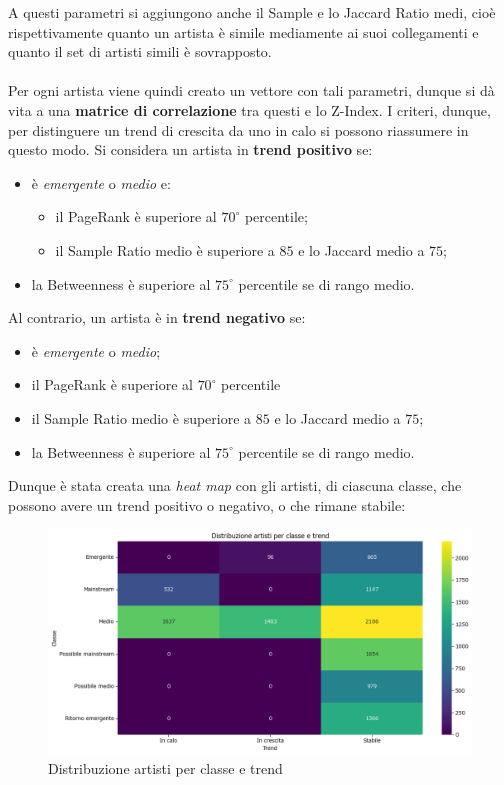 \documentclass[sigchi]{acmart}
\begin{document}
A questi parametri si aggiungono anche il Sample e lo Jaccard Ratio medi, cioè rispettivamente quanto un artista è simile mediamente ai suoi collegamenti e quanto il set di artisti simili è sovrapposto. \\ \\ Per ogni artista viene quindi creato un vettore con tali parametri, dunque si dà vita a una {\bfseries matrice di correlazione} tra questi e lo Z-Index. I criteri, dunque, per distinguere un trend di crescita da uno in calo si possono riassumere in questo modo.
Si considera un artista in {\bfseries trend positivo} se:

\begin{itemize}
	\item è {\itshape emergente} o {\itshape medio} e:
	\begin{itemize}
		\item il PageRank è superiore al $70^\circ$ percentile;
		\item il Sample Ratio medio è superiore a $85$ e lo Jaccard medio a $75$;
	\end{itemize}
	\item la Betweenness è superiore al $75^\circ$ percentile se di rango medio.
\end{itemize}
Al contrario, un artista è in {\bfseries trend negativo} se:

\begin{itemize}
\item è {\itshape emergente} o {\itshape medio};
\item il PageRank è superiore al $70^\circ$ percentile
\item il Sample Ratio medio è superiore a $85$ e lo Jaccard medio a $75$;
\item la Betweenness è superiore al $75^\circ$ percentile se di rango medio.
\end{itemize}

\noindent Dunque è stata creata una {\itshape heat map} con gli artisti, di ciascuna classe, che possono avere un trend positivo o negativo, o che rimane stabile:

\begin{figure}[H]
\centering
\includegraphics[width=0.45
\textwidth]{../open_problem/plots/3_4/clTrendDist.png}
\caption{Distribuzione artisti per classe e trend}
\label{fig:clTrendDist}
\end{figure}
\end{document}
